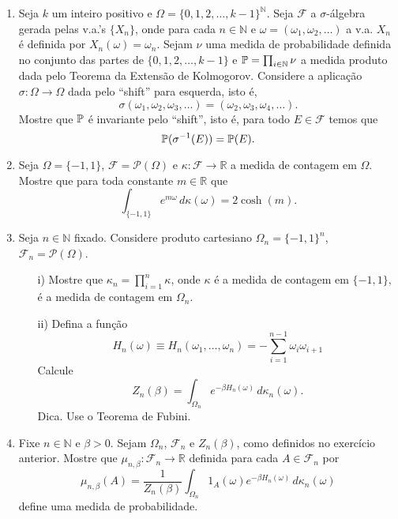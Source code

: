 \begin{enumerate}[leftmargin=*]
\item
Seja $k$ um inteiro positivo e 
$\Omega=\{0,1,2,\ldots,k-1\}^{\mathbb{N}}$. 
Seja $\mathcal{F}$ a $\sigma$-álgebra gerada 
pelas v.a.'s $\{X_n\}$, onde para 
cada $n\in\mathbb{N}$ e $\omega=(\omega_1,\omega_2,\ldots)$ 
a v.a. $X_n$ é definida por $X_n(\omega)=\omega_n$. 
Sejam $\nu$ uma medida de probabilidade definida no conjunto das partes
de $\{0,1,2,\ldots,k-1\}$ e $\P = \prod_{i\in\mathbb{N}}\nu$ 
a medida produto dada pelo Teorema da Extensão de Kolmogorov.
Considere a aplicação $\sigma:\Omega\to\Omega$ 
dada pelo ``shift'' para esquerda, isto é, 
	\[
		\sigma(\omega_1,\omega_2,\omega_3,\ldots)
		=
		(\omega_2,\omega_3,\omega_4,\ldots).
	\] 
Mostre que $\P$ é invariante pelo ``shift'', isto é, 
para todo $E\in\mathcal{F}$ temos que 
	\[
	\P(\sigma^{-1}(E)) = \P(E).
	\] 











\item
Seja $\Omega=\{-1,1\}$, $\mathcal{F}=\mathcal{P}(\Omega)$ e 
$\kappa:\mathcal{F}\to \mathbb{R}$ 
a medida de contagem em $\Omega$.
Mostre que para toda constante $m\in\mathbb{R}$ que
\[
	\int_{\{-1,1\}} e^{m\omega}\, d\kappa(\omega)
	=
	2\cosh(m).
\]


\item 
Seja $n\in\mathbb{N}$ fixado. 
Considere produto cartesiano $\Omega_n=\{-1,1\}^n$, 
$\mathcal{F}_n=\mathcal{P}(\Omega)$.

	\begin{itemize}

		\item[i)]
		Mostre que  
		$\kappa_n = \prod_{i=1}^n \kappa$, 
		onde $\kappa$ é a medida de contagem em $\{-1,1\}$, 
		é a medida de contagem em $\Omega_n$.
		
		
		\item[ii)]
		Defina a função 
		\[
			H_n(\omega)
			\equiv
			H_n(\omega_1,\ldots,\omega_n)
			= 
			-\sum_{i=1}^{n-1} \omega_i\omega_{i+1}
		\]
		Calcule
		\[
			Z_n(\beta)
			=
			\int_{\Omega_n} 
			e^{-\beta H_n(\omega)}\, 
			d\kappa_n(\omega).
			\]
		Dica. Use o Teorema de Fubini.		
		\end{itemize}





\item 
Fixe $n\in\mathbb{N}$ e $\beta>0$. Sejam 
$\Omega_n$, $\mathcal{F}_n$ e $Z_n(\beta)$,
como definidos no exercício anterior. 
Mostre que $\mu_{n,\beta}:\mathcal{F}_n\to\mathbb{R}$
definida para cada $A\in \mathcal{F}_n$ por 
\[
	\mu_{n,\beta}(A)
	=	
	\frac{1}{Z_{n}(\beta)}
	\int_{\Omega_n} 
	1_{A}(\omega)
	e^{-\beta H_n(\omega)}\, 
	d\kappa_n(\omega)
\]
define uma medida de probabilidade.












\end{enumerate}
